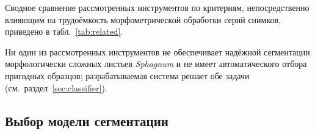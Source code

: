 Сводное сравнение рассмотренных инструментов по критериям, непосредственно влияющим на
трудоёмкость морфометрической обработки серий снимков, приведено в
табл.~\ref{tab:related}.

\begin{table}[H]
\centering
\caption{Сравнение существующих инструментов по ключевым критериям}
\label{tab:related}
\end{table}

Ни один из рассмотренных инструментов не обеспечивает надёжной сегментации морфологически
сложных листьев \textit{Sphagnum} и не имеет автоматического отбора пригодных образцов;
разрабатываемая система решает обе задачи (см.\ раздел~\ref{sec:classifier}).

\subsection{Выбор модели сегментации}

